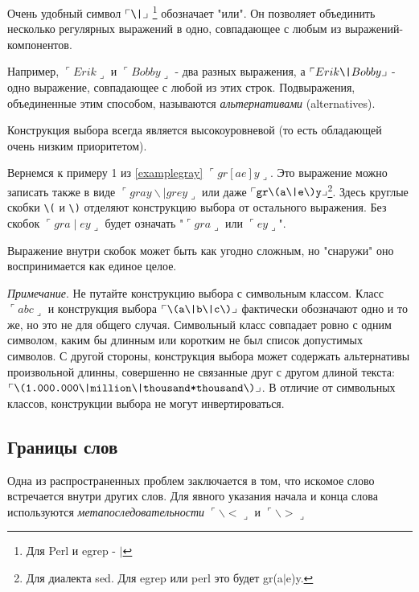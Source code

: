 \label{reor}
Очень удобный символ $\ulcorner \verb+\|+ \lrcorner$ \footnote{Для Perl и egrep - $\mid$ } обозначает "или". Он позволяет объединить несколько регулярных выражений в одно, совпадающее с любым из выражений-компонентов. 

Например, $\ulcorner Erik \lrcorner$ и $\ulcorner Bobby \lrcorner$ - два разных выражения, а  $\ulcorner Erik\verb+\|+Bobby \lrcorner$ - одно выражение, совпадающее с любой из этих строк. Подвыражения, объединенные этим способом, называются \emph{альтернативами} (alternatives).

Конструкция выбора всегда является высокоуровневой (то есть обладающей очень низким приоритетом).

Вернемся к примеру 1 из \ref{examplegray} $\ulcorner gr[ae]y \lrcorner$. Это выражение можно записать также в виде $\ulcorner gray \backslash \mid grey \lrcorner$ или даже $\ulcorner \verb+gr\(a\|e\)y+ \lrcorner$\footnote{Для диалекта sed. Для egrep или perl это будет gr(a$\mid$e)y.}. Здесь круглые скобки \verb+\(+ и \verb+\)+ отделяют конструкцию выбора от остального выражения. Без скобок $\ulcorner gra\mid ey \lrcorner$ будет означать "$\ulcorner gra \lrcorner$ или $\ulcorner ey \lrcorner$".

Выражение внутри скобок может быть как угодно сложным, но "снаружи" оно воспринимается как единое целое.
 
\emph{Примечание}. Не путайте конструкцию выбора с символьным классом. Класс $\ulcorner abc \lrcorner$ и конструкция выбора $\ulcorner \verb+\(a\|b\|c\)+ \lrcorner$ фактически обозначают одно и то же, но это не для общего случая. Символьный класс совпадает ровно с одним символом, каким бы длинным или коротким не был список допустимых символов. С другой стороны, конструкция выбора может содержать альтернативы произвольной длинны, совершенно не связанные друг с другом длиной текста: $\ulcorner \verb+\(1.000.000\|million\|thousand*thousand\)+ \lrcorner$. В отличие от символьных классов, конструкции выбора не могут инвертироваться.

\subsection{Границы слов}

Одна из распространенных проблем заключается в том, что искомое слово встречается внутри других слов. Для явного указания начала и конца слова используются \emph{метапоследовательности} $\ulcorner \backslash< \lrcorner$ и $\ulcorner \backslash> \lrcorner$

